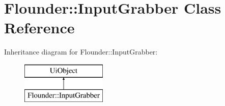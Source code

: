 \hypertarget{class_flounder_1_1_input_grabber}{}\section{Flounder\+:\+:Input\+Grabber Class Reference}
\label{class_flounder_1_1_input_grabber}
Inheritance diagram for Flounder\+:\+:Input\+Grabber\+:\begin{figure}[H]
\begin{center}
\leavevmode
\includegraphics[height=2.000000cm]{class_flounder_1_1_input_grabber}
\end{center}
\end{figure}
